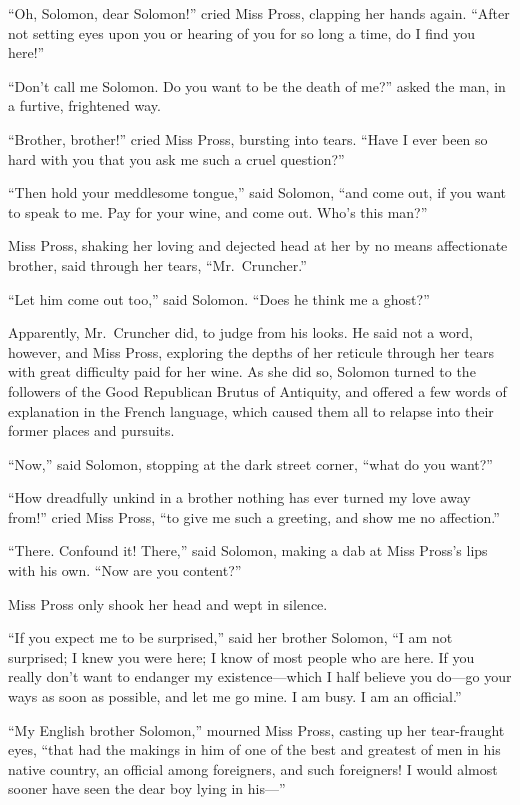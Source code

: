 ``Oh, Solomon, dear Solomon!'' cried Miss Pross, clapping her hands
again.  ``After not setting eyes upon you or hearing of you for so
long a time, do I find you here!''

``Don't call me Solomon.  Do you want to be the death of me?''  asked
the man, in a furtive, frightened way.

``Brother, brother!'' cried Miss Pross, bursting into tears.  ``Have I
ever been so hard with you that you ask me such a cruel question?''

``Then hold your meddlesome tongue,'' said Solomon, ``and come out, if
you want to speak to me.  Pay for your wine, and come out.
Who's this man?''

Miss Pross, shaking her loving and dejected head at her by no means
affectionate brother, said through her tears, ``Mr.\ Cruncher.''

``Let him come out too,'' said Solomon.  ``Does he think me a ghost?''

Apparently, Mr.\ Cruncher did, to judge from his looks.  He said not a
word, however, and Miss Pross, exploring the depths of her reticule
through her tears with great difficulty paid for her wine.  As she
did so, Solomon turned to the followers of the Good Republican Brutus
of Antiquity, and offered a few words of explanation in the French
language, which caused them all to relapse into their former places
and pursuits.

``Now,'' said Solomon, stopping at the dark street corner, ``what do you want?''

``How dreadfully unkind in a brother nothing has ever turned my love
away from!'' cried Miss Pross, ``to give me such a greeting, and show
me no affection.''

``There.  Confound it!  There,'' said Solomon, making a dab at Miss
Pross's lips with his own.  ``Now are you content?''

Miss Pross only shook her head and wept in silence.

``If you expect me to be surprised,'' said her brother Solomon, ``I am
not surprised; I knew you were here; I know of most people who are
here.  If you really don't want to endanger my existence---which I half
believe you do---go your ways as soon as possible, and let me go mine.
I am busy.  I am an official.''

``My English brother Solomon,'' mourned Miss Pross, casting up her
tear-fraught eyes, ``that had the makings in him of one of the best
and greatest of men in his native country, an official among
foreigners, and such foreigners!  I would almost sooner have seen the
dear boy lying in his---''

